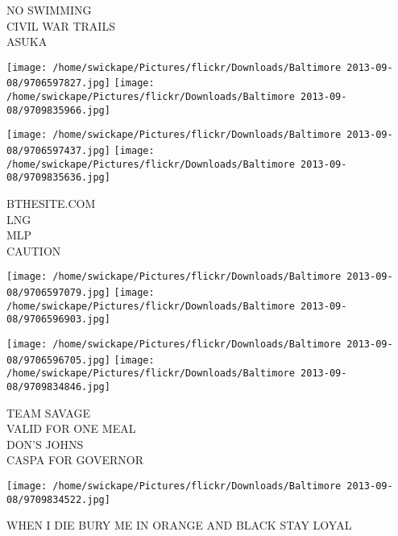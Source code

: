 \documentclass[10pt,letterpaper]{article}
\begin{document}
NO SWIMMING\\
CIVIL WAR TRAILS\\
ASUKA
\pagebreak

\texttt{[image: /home/swickape/Pictures/flickr/Downloads/Baltimore 2013-09-08/9706597827.jpg]}
\texttt{[image: /home/swickape/Pictures/flickr/Downloads/Baltimore 2013-09-08/9709835966.jpg]}

\texttt{[image: /home/swickape/Pictures/flickr/Downloads/Baltimore 2013-09-08/9706597437.jpg]}
\texttt{[image: /home/swickape/Pictures/flickr/Downloads/Baltimore 2013-09-08/9709835636.jpg]}

BTHESITE.COM\\
LNG\\
MLP\\
CAUTION
\pagebreak

\texttt{[image: /home/swickape/Pictures/flickr/Downloads/Baltimore 2013-09-08/9706597079.jpg]}
\texttt{[image: /home/swickape/Pictures/flickr/Downloads/Baltimore 2013-09-08/9706596903.jpg]}

\texttt{[image: /home/swickape/Pictures/flickr/Downloads/Baltimore 2013-09-08/9706596705.jpg]}
\texttt{[image: /home/swickape/Pictures/flickr/Downloads/Baltimore 2013-09-08/9709834846.jpg]}

TEAM SAVAGE\\
VALID FOR ONE MEAL\\
DON'S JOHNS\\
CASPA FOR GOVERNOR
\pagebreak

\texttt{[image: /home/swickape/Pictures/flickr/Downloads/Baltimore 2013-09-08/9709834522.jpg]}

WHEN I DIE BURY ME IN ORANGE AND BLACK STAY LOYAL
\pagebreak
\end{document}
